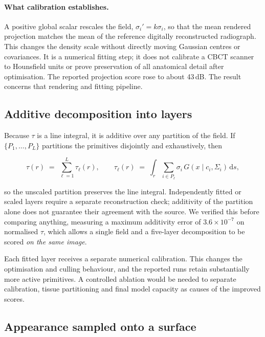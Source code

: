 \documentclass[11pt,a4paper]{article}
\begin{document}
\paragraph{What calibration establishes.} A positive global scalar rescales the field,
$\sigma_i'=k\sigma_i$, so that the mean rendered projection matches the mean of the
reference digitally reconstructed radiograph. This changes the density
scale without directly moving Gaussian centres or covariances. It is a numerical fitting
step; it does not calibrate a CBCT scanner to Hounsfield units or prove preservation of
all anatomical detail after optimisation. The reported projection score rose to about
43\,dB. The result concerns that rendering and fitting pipeline.

\subsection{Additive decomposition into layers}

Because $\tau$ is a line integral, it is additive over any partition of the field. If
$\{P_1, \dots, P_L\}$ partitions the primitives disjointly and exhaustively, then

\[
  \tau(r) \;=\; \sum_{\ell=1}^{L} \tau_\ell(r),
  \qquad
  \tau_\ell(r) \;=\; \int_r \sum_{i \in P_\ell} \sigma_i\, G(x \mid c_i, \Sigma_i) \,\mathrm{d}s ,
\]

so the unscaled partition preserves the line integral. Independently fitted or scaled
layers require a separate reconstruction check; additivity of the partition alone does
not guarantee their agreement with the source. We verified this before
comparing anything, measuring a maximum additivity error of $3.6 \times 10^{-7}$ on
normalised $\tau$, which allows a single field and a five-layer decomposition to be scored
\emph{on the same image}.


Each fitted layer receives a separate numerical calibration. This changes the optimisation
and culling behaviour, and the reported runs retain substantially more active primitives.
A controlled ablation would be needed to separate calibration, tissue partitioning and
final model capacity as causes of the improved scores.

\subsection{Appearance sampled onto a surface}
\end{document}
